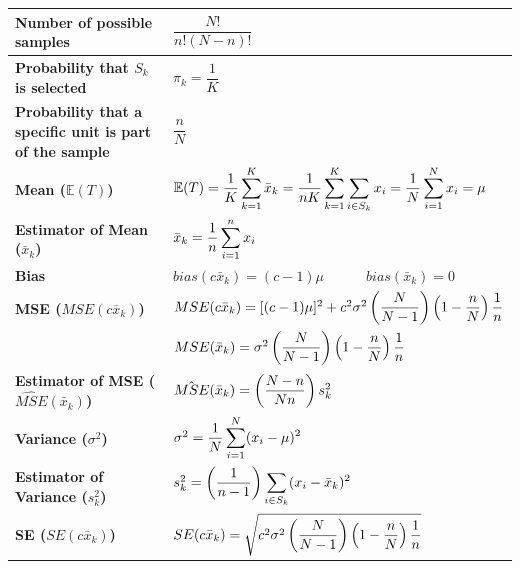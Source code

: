 \renewcommand{\arraystretch}{2.5}
\begin{longtable}{|p{5cm}|p{9cm}|}
    \hline\endfirsthead
    \hline\endhead
    \hline\endfoot
    \hline\endlastfoot

    \textbf{Number of possible samples} & \( \dfrac{N!}{n!(N-n)!} \) \\
    \hline

    \textbf{Probability that $S_k$ is selected} & $\pi_k = \dfrac{1}{K}$ \\
    \hline

    \textbf{Probability that a specific unit is part of the sample} & $\dfrac{n}{N}$ \\
    \hline

    \textbf{Mean ($\mathbb{E}(T)$)} & $
        \mathbb{E}(T) = 
        \dfrac{1}{K} \displaystyle\sum_{k=1}^{K}
        \bar{x}_k 
        =
        \dfrac{1}{nK} \displaystyle\sum_{k=1}^{K}
        \displaystyle\sum_{i \in S_k} x_i
        =
        \dfrac{1}{N} \displaystyle\sum_{i=1}^{N} x_i
        = \mu
    $ \\[2ex]
    \hline

    \textbf{Estimator of Mean ($\bar{x}_k$)} & $
        \bar{x}_k=
        \dfrac{1}{n} \displaystyle\sum_{i=1}^{n} x_i
    $ \\[2ex]
    \hline

    \textbf{Bias} & $
        bias(c\bar{x}_k) = (c-1)\mu
        \quad\quad\quad
        bias(\bar{x}_k) = 0
    $ \\[1ex]
    \hline

    \textbf{MSE ($MSE(c\bar{x}_k)$)} & $
        MSE(c\bar{x}_k) 
        = [(c-1)\mu]^2 +
        c^2 \sigma^2 \left(\dfrac{N}{N-1} \right)\left( 1-\dfrac{n}{N} \right)\dfrac{1}{n}
    $\\[1ex]
    & $MSE(\bar{x}_k) 
        = \sigma^2 \left(\dfrac{N}{N-1} \right)\left( 1-\dfrac{n}{N} \right)\dfrac{1}{n}$ \\[1ex]
    \hline

    \textbf{Estimator of MSE ($\hat{MSE}(\bar{x}_k)$)} & $
        \hat{MSE}(\bar{x}_k) = \left(\dfrac{N-n}{Nn} \right)s_k^2
    $\\[1ex]
    \hline

    \textbf{Variance ($\sigma^2$)} & $
        \sigma^2 = \dfrac{1}{N} \displaystyle\sum_{i=1}^{N}
        (x_i - \mu)^2
    $\\[1ex]
    \hline

    \textbf{Estimator of Variance ($s_k^2$)} & $
        s_k^2 = \left(\dfrac{1}{n-1}\right) \displaystyle\sum_{i\in S_k}
        (x_i - \bar{x}_k)^2
    $\\[1ex]
    \hline

    \textbf{SE ($SE(c\bar{x}_k)$)} & $
        SE(c\bar{x}_k) = \sqrt{
            c^2 \sigma^2 
            \left( \dfrac{N}{N-1} \right)
            \left( 1-\dfrac{n}{N} \right)
            \dfrac{1}{n}
        }
    $\\[1ex]
    \hline
\end{longtable}

